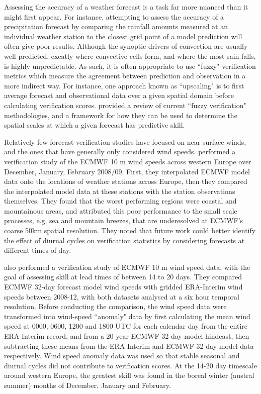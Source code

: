 \documentclass[alpha-refs]{wiley-article}
\begin{document}
Assessing the accuracy of a weather forecast is a task far more nuanced than it might first appear. For instance, attempting to assess the accuracy of a precipitation forecast by comparing the rainfall amounts measured at an individual weather station to the closest grid point of a model prediction will often give poor results. Although the synoptic drivers of convection are usually well predicted, excatly where convective cells form, and where the most rain falls, is highly unpredictable. As such, it is often appropriate to use ``fuzzy" verification metrics which measure the agreement between prediction and observation in a more indirect way. For instance, one approach known as ``upscaling" is to first average forecast and observational data over a given spatial domain before calculating verification scores. \citet{ebert08} provided a review of current ``fuzzy verification" methodologies, and a framework for how they can be used to determine the spatial scales at which a given forecast has predictive skill.      

Relatively few forecast verification studies have focused on near-surface winds, and the ones that have generally only considered wind speeds. \citet{pinson12} performed a verification study of the ECMWF 10 m wind speeds across western Europe over December, January, February 2008/09. First, they interpolated ECMWF model data onto the locations of weather stations across Europe, then they compared the interpolated model data at these stations with the station observations themselves. They found that the worst performing regions were coastal and mountainous areas, and attributed this poor performance to the small scale processes, e.g. sea and mountain breezes, that are underesolved at ECMWF's coarse 50km spatial resolution. They noted that future work could better identify the effect of diurnal cycles on verification statistics by considering forecasts at different times of day. 

\citet{lynch14} also performed a verification study of ECMWF 10 m wind speed data, with the goal of assessing skill at lead times of between 14 to 20 days. They compared ECMWF 32-day forecast model wind speeds with gridded ERA-Interim wind speeds between 2008-12, with both datasets analysed at a six hour temporal resolution. Before conducting the comparison, the wind speed data were transformed into wind-speed ``anomaly" data by first calculating the mean wind speed at 0000, 0600, 1200 and 1800 UTC for each calendar day from the entire ERA-Interim record, and from a 20 year ECMWF 32-day model hindcast, then subtracting these means from the ERA-Interim and ECMWF 32-day model data respectively. Wind speed anomaly data was used so that stable seasonal and diurnal cycles did not contribute to verification scores. At the 14-20 day timescale around western Europe, the greatest skill was found in the boreal winter (austral summer) months of December, January and February.  
\end{document}
